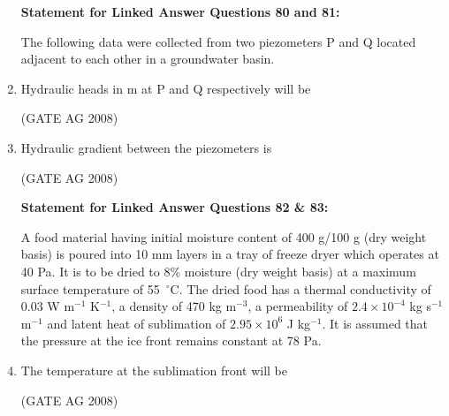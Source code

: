 \documentclass[journal,12pt,onecolumn]{IEEEtran}
\begin{document}
\begin{enumerate}
\medskip


\textbf{Statement for Linked Answer Questions 80 and 81:}

The following data were collected from two piezometers P and Q located adjacent to each other in a groundwater basin.



\item 
 Hydraulic heads in m at P and Q respectively will be
\begin{enumerate}
\end{enumerate}
\hfill(GATE AG 2008)\\

\medskip

\item 
 Hydraulic gradient between the piezometers is
\begin{enumerate}
\end{enumerate}
\hfill(GATE AG 2008)\\

\medskip

\textbf{Statement for Linked Answer Questions 82 \& 83:}

A food material having initial moisture content of 400 g/100 g (dry weight basis) is poured into 10 mm layers in a tray of freeze dryer which operates at 40 Pa. It is to be dried to 8\% moisture (dry weight basis) at a maximum surface temperature of 55~$^\circ$C. The dried food has a thermal conductivity of 0.03 W m$^{-1}$ K$^{-1}$, a density of 470 kg m$^{-3}$, a permeability of $2.4\times 10^{-4}$ kg s$^{-1}$ m$^{-1}$ and latent heat of sublimation of $2.95 \times 10^6$ J kg$^{-1}$. It is assumed that the pressure at the ice front remains constant at 78 Pa.


\item 
 The temperature at the sublimation front will be
\begin{enumerate}
\end{enumerate}
\hfill(GATE AG 2008)\\


\end{enumerate}
\end{document}
